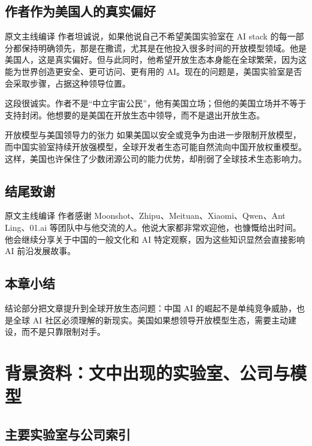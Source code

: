 \documentclass[a4paper]{article}
\begin{document}
\subsection{作者作为美国人的真实偏好}

\begin{translationbox}{原文主线编译}
作者坦诚说，如果他说自己不希望美国实验室在 AI stack 的每一部分都保持明确领先，那是在撒谎，尤其是在他投入很多时间的开放模型领域。他是美国人，这是真实偏好。但与此同时，他希望开放生态本身能在全球繁荣，因为这能为世界创造更安全、更可访问、更有用的 AI。现在的问题是，美国实验室是否会采取步骤，占据这种领导位置。
\end{translationbox}

这段很诚实。作者不是``中立宇宙公民''，他有美国立场；但他的美国立场并不等于支持封闭。他想要的是美国在开放生态中领导，而不是退出开放生态。

\begin{warningbox}{开放模型与美国领导力的张力}
如果美国以安全或竞争为由进一步限制开放模型，而中国实验室持续开放强模型，全球开发者生态可能自然流向中国开放权重模型。这样，美国也许保住了少数闭源公司的能力优势，却削弱了全球技术生态影响力。
\end{warningbox}

\subsection{结尾致谢}

\begin{translationbox}{原文主线编译}
作者感谢 Moonshot、Zhipu、Meituan、Xiaomi、Qwen、Ant Ling、01.ai 等团队中与他交流的人。他说大家都非常欢迎他，也慷慨给出时间。他会继续分享关于中国的一般文化和 AI 特定观察，因为这些知识显然会直接影响 AI 前沿发展故事。
\end{translationbox}

\subsection{本章小结}

结论部分把文章提升到全球开放生态问题：中国 AI 的崛起不是单纯竞争威胁，也是全球 AI 社区必须理解的新现实。美国如果想领导开放模型生态，需要主动建设，而不是只靠限制对手。


\section{背景资料：文中出现的实验室、公司与模型}

\subsection{主要实验室与公司索引}
\end{document}

